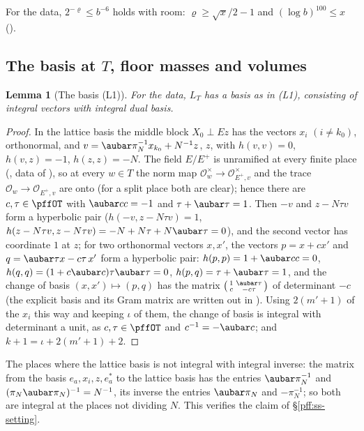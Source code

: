 \documentclass[10pt]{amsart}
\newtheorem{lemma}[theorem]{Lemma}
\theoremstyle{definition}
\theoremstyle{remark}
\providecommand{\auO}{\mathcal O}
\begin{document}
For the data, $2^{-\varrho}\le b^{-6}$ holds with room: $\varrho\ge\sqrt x/2-1$ and $(\log b)^{100}
\le x$ ({\cite[Lemma~13.4]{P46}}).

\subsection{The basis at $T$, floor masses and volumes}\label{pff:ss-floors}

\begin{lemma}[The basis (L1)]\label{pff:L1}
For the data, $L_T$ has a basis as in \textup{(L1)}, consisting of integral vectors with integral
dual basis.
\end{lemma}
\begin{proof}
In the lattice basis the middle block $X_0\perp Ez$ has the vectors $x_i$ $(i\ne k_0)$, orthonormal,
and $v=\aubar\pi_N^{-1}x_{k_0}+N^{-1}z$, $z$, with $h(v,v)=0$, $h(v,z)=-1$, $h(z,z)=-N$. The field
$E/E^+$ is unramified at every finite place ({\cite[\S2.1]{P51}}, data of
{\cite[\S14.1]{P46}}), so at every $w\in T$ the norm map $\auO_w^\times\to\auO_{E^+,v}^\times$ and the
trace $\auO_w\to\auO_{E^+,v}$ are onto (for a split place both are clear); hence there are
$c,\tau\in\pffOT$ with $\aubar cc=-1$ and $\tau+\aubar\tau=1$. Then $-v$ and $z-N\tau v$ form a
hyperbolic pair ($h(-v,z-N\tau v)=1$, $h(z-N\tau v,z-N\tau v)=-N+N\tau+N\aubar\tau=0$), and the second
vector has coordinate $1$ at $z$; for two orthonormal vectors $x,x'$, the vectors $p=x+cx'$ and
$q=\aubar\tau x-c\tau\,x'$ form a hyperbolic pair: $h(p,p)=1+\aubar cc=0$, $h(q,q)=(1+c\aubar c)\tau\aubar\tau=0$,
$h(p,q)=\tau+\aubar\tau=1$, and the change of basis $(x,x')\mapsto(p,q)$ has the matrix
$\bigl(\begin{smallmatrix}1&\aubar\tau\\c&-c\tau\end{smallmatrix}\bigr)$ of determinant $-c$ (the explicit basis and its
Gram matrix are written out in {\cite[\S3.1.6(ii)]{P51}}). Using $2(m'+1)$ of the $x_i$ this way and keeping
$\iota$ of them, the change of basis is integral with determinant a unit, as $c,\tau\in\pffOT$ and
$c^{-1}=-\aubar c$; and $k+1=\iota+2(m'+1)+2$.
\end{proof}

The places where the lattice basis is not integral with integral inverse: the matrix from the basis
$e_a,x_i,z,e_a^*$ to the lattice basis has the entries $\aubar\pi_N^{-1}$ and $(\pi_N\aubar\pi_N)^{-1}=
N^{-1}$, its inverse the entries $\aubar\pi_N$ and $-\pi_N^{-1}$; so both are integral at the places
not dividing $N$. This verifies the claim of \S\ref{pff:ss-setting}.
\end{document}
